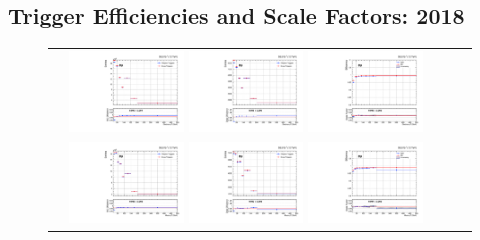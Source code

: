 \clearpage
\subsection{Trigger Efficiencies and Scale Factors: 2018}
\label{TrigSFResults2018}

\begin{figure}[htb]
  \begin{center}
    \begin{tabular}{ccc}
      \includegraphics[width=0.30\textwidth]{fig_2018_TrigSF/g_lepApt_emu_MC.pdf}
      \includegraphics[width=0.30\textwidth]{fig_2018_TrigSF/g_lepApt_emu_data.pdf}
      \includegraphics[width=0.30\textwidth]{fig_2018_TrigSF/g_emu_lepApt_FullSystUncBand.pdf}\\
      \includegraphics[width=0.30\textwidth]{fig_2018_TrigSF/g_lepBpt_emu_MC.pdf}
      \includegraphics[width=0.30\textwidth]{fig_2018_TrigSF/g_lepBpt_emu_data.pdf}
      \includegraphics[width=0.30\textwidth]{fig_2018_TrigSF/g_emu_lepBpt_FullSystUncBand.pdf}\\

\end{tabular}
\end{center}
\end{figure}
